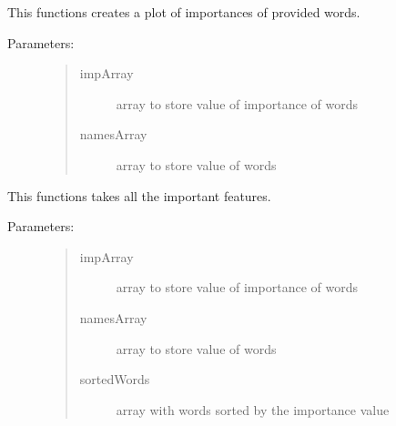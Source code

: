 \documentclass[letterpaper,10pt,english]{sphinxmanual}
\begin{document}
\begin{fulllineitems}
\label{\detokenize{metrics:metrics.plotImportant}}
\pysigstartsignatures
{}
\pysigstopsignatures
\sphinxAtStartPar
This functions creates a plot of importances of provided words.
\begin{description}
\item[{Parameters:}] \leavevmode\begin{quote}\begin{description}
\item[{impArray}] \leavevmode
\sphinxAtStartPar
array to store value of importance of words

\item[{namesArray}] \leavevmode
\sphinxAtStartPar
array to store value of words

\end{description}\end{quote}

\end{description}

\end{fulllineitems}


\begin{fulllineitems}
\label{\detokenize{metrics:metrics.takeAllFeatures}}
\pysigstartsignatures
{}
\pysigstopsignatures
\sphinxAtStartPar
This functions takes all the important features.
\begin{description}
\item[{Parameters:}] \leavevmode\begin{quote}\begin{description}
\item[{impArray}] \leavevmode
\sphinxAtStartPar
array to store value of importance of words

\item[{namesArray}] \leavevmode
\sphinxAtStartPar
array to store value of words

\item[{sortedWords}] \leavevmode
\sphinxAtStartPar
array with words sorted by the importance value

\end{description}\end{quote}

\end{description}

\end{fulllineitems}
\end{document}
